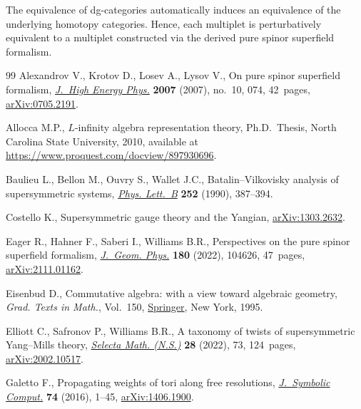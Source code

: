\documentclass[11pt]{article}
\numberwithin{equation}{section}
\numberwithin{equation}{section}
\begin{document}
\begin{rmk}
	The equivalence of dg-categories automatically induces an equivalence of the underlying homotopy categories. Hence, each multiplet is perturbatively equivalent to a multiplet constructed via the derived pure spinor superfield formalism.
\end{rmk}
\begin{thebibliography}{99}
Alexandrov V., Krotov D., Losev A., Lysov V., On pure spinor superfield
 formalism, \href{https://doi.org/10.1088/1126-6708/2007/10/074}{\textit{J.~High Energy Phys.}} \textbf{2007} (2007), no.~10, 074,
 42~pages, \href{https://arxiv.org/abs/0705.2191}{arXiv:0705.2191}.

Allocca M.P., $L$-infinity algebra representation theory, Ph.D.~Thesis,
 {N}orth Carolina State University, 2010, available at
 \url{https://www.proquest.com/docview/897930696}.

Baulieu L., Bellon M., Ouvry S., Wallet J.C., Batalin--{V}ilkovisky analysis of
 supersymmetric systems, \href{https://doi.org/10.1016/0370-2693(90)90557-M}{\textit{Phys. Lett.~B}} \textbf{252} (1990), 387--394.

Costello K., Supersymmetric gauge theory and the {Y}angian, \href{https://arxiv.org/abs/1303.2632}{arXiv:1303.2632}.

Eager R., Hahner F., Saberi I., Williams B.R., Perspectives on the pure spinor
 superfield formalism, \href{https://doi.org/10.1016/j.geomphys.2022.104626}{\textit{J.~Geom. Phys.}} \textbf{180} (2022), 104626,
 47~pages, \href{https://arxiv.org/abs/2111.01162}{arXiv:2111.01162}.

Eisenbud D., Commutative algebra: with a view toward algebraic geometry,
 \textit{Grad. Texts in Math.}, Vol.~150, \href{https://doi.org/10.1007/978-1-4612-5350-1}{Springer}, New York, 1995.

Elliott C., Safronov P., Williams B.R., A taxonomy of twists of supersymmetric
 {Y}ang--{M}ills theory, \href{https://doi.org/10.1007/s00029-022-00786-y}{\textit{Selecta Math. (N.S.)}} \textbf{28} (2022), 73,
 124~pages, \href{https://arxiv.org/abs/2002.10517}{arXiv:2002.10517}.

Galetto F., Propagating weights of tori along free resolutions,
 \href{https://doi.org/10.1016/j.jsc.2015.05.004}{\textit{J.~Symbolic Comput.}} \textbf{74} (2016), 1--45, \href{https://arxiv.org/abs/1406.1900}{arXiv:1406.1900}.


\end{thebibliography}
\end{document}
